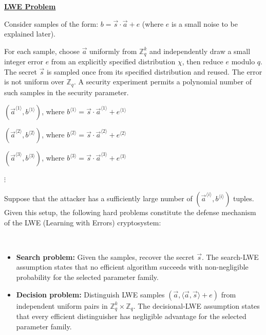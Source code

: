 \begin{tcolorbox}[title={\textbf{\tboxlabel{\ref*{subsec:lattice-overview}} The LWE (Learning with Errors) and RLWE Problems}}]
\textbf{\underline{LWE Problem}}

Consider samples of the form: $b = \vec{s} \cdot\vec{a} + e$ (where $e$ is a small noise to be explained later). 

For each sample, choose $\vec a$ uniformly from $\mathbb Z_q^k$ and independently draw a small integer error $e$ from an explicitly specified distribution $\chi$, then reduce $e$ modulo $q$. The secret $\vec s$ is sampled once from its specified distribution and reused. The error is not uniform over $\mathbb Z_q$. A security experiment permits a polynomial number of such samples in the security parameter.

$(\vec{a}^{\langle 1 \rangle}, b^{\langle 1 \rangle})$, where $b^{\langle 1 \rangle} = \vec{s} \cdot \vec{a}^{\langle 1 \rangle} + e^{\langle 1 \rangle}$ 

$(\vec{a}^{\langle 2 \rangle}, b^{\langle 2 \rangle})$, where $b^{\langle 2 \rangle} = \vec{s} \cdot \vec{a}^{\langle 2 \rangle} + e^{\langle 2 \rangle}$ 

$(\vec{a}^{\langle 3 \rangle}, b^{\langle 3 \rangle})$, where $b^{\langle 3 \rangle} = \vec{s} \cdot \vec{a}^{\langle 3 \rangle} + e^{\langle 3 \rangle}$ 

\text{ } $\vdots$

Suppose that the attacker has a sufficiently large number of $(\vec{a}^{\langle i \rangle}, b^{\langle i \rangle})$ tuples. Given this setup, the following hard problems constitute the defense mechanism of the LWE (Learning with Errors) cryptosystem:

$ $

\begin{itemize}
\item \textbf{Search problem:} Given the samples, recover the secret $\vec s$. The search-LWE assumption states that no efficient algorithm succeeds with non-negligible probability for the selected parameter family.
\item \textbf{Decision problem:} Distinguish LWE samples $(\vec a,\langle\vec a,\vec s\rangle+e)$ from independent uniform pairs in $\mathbb Z_q^k\times\mathbb Z_q$. The decisional-LWE assumption states that every efficient distinguisher has negligible advantage for the selected parameter family.
\end{itemize}

$ $


\end{tcolorbox}
